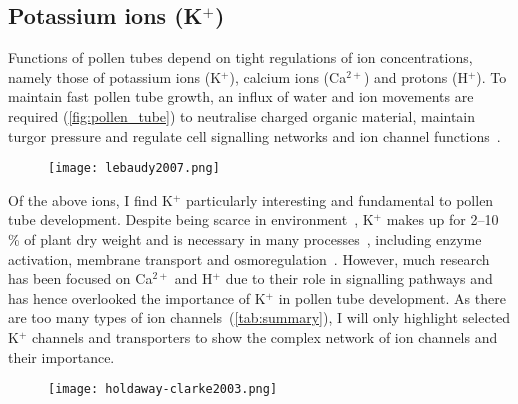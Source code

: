 \documentclass[11pt]{article}
\begin{document}
\begin{multicols*}{2}
\subsection{Potassium ions (K$^{+}$)}
Functions of pollen tubes depend on tight regulations of ion concentrations, namely those of potassium ions (K$^{+}$), calcium ions (Ca$^{2+}$) and protons (H$^{+}$). To maintain fast pollen tube growth, an influx of water and ion movements are required (\autoref{fig:pollen_tube}) to neutralise charged organic material, maintain turgor pressure and regulate cell signalling networks and ion channel functions~\citep{Michard2009}. 

\begin{figure}[H]
  \centering
    \texttt{[image: lebaudy2007.png]}
  \label{fig:locations}
\end{figure}

Of the above ions, I find K$^{+}$ particularly interesting and fundamental to pollen tube development. Despite being scarce in environment~\citep{Ashley2006}, K$^{+}$ makes up for 2--10\,\% of plant dry weight and is necessary in many processes~\citep{Wang2013a}, including enzyme activation, membrane transport and osmoregulation~\citep{Clarkson1980}. However, much research has been focused on Ca$^{2+}$ and H$^{+}$ due to their role in signalling pathways and has hence overlooked the importance of K$^{+}$ in pollen tube development. As there are too many types of ion channels~(\autoref{tab:summary}), I will only highlight selected K$^{+}$ channels and transporters to show the complex network of ion channels and their importance. 

\begin{figure}[H]
  \centering
    \texttt{[image: holdaway-clarke2003.png]}
  \label{fig:pollen_tube}
\end{figure}


\end{multicols*}
\end{document}
